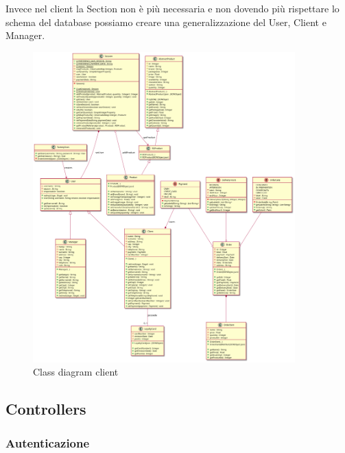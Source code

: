 \documentclass[12pt, a4paper]{report}
\begin{document}
Invece nel client la Section non è più necessaria e non dovendo più rispettare
lo schema del database possiamo creare una generalizzazione del User, Client e
Manager.

\begin{figure}[h]
  \centering
  \includegraphics[width=0.9\textwidth]{client_models_class.png}
  \caption{Class diagram client}
\end{figure}

\newpage


\subsection{Controllers}

\subsubsection{Autenticazione}

\end{document}
